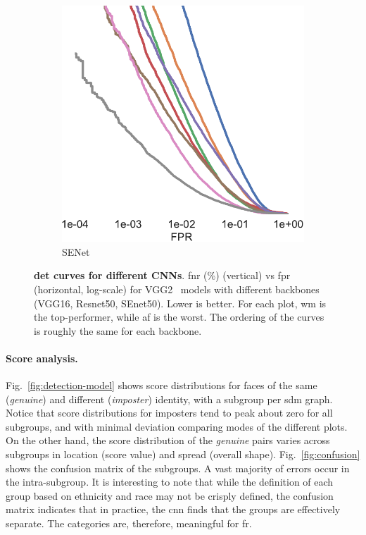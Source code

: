 \begin{figure}[h!]
\begin{subfigure}[t]{.27\linewidth}
    \includegraphics[width=.75\linewidth]{figures/curve_senet50_subgroups-crop.pdf}
    \caption{SENet~\cite{hu2018squeeze}}
    \end{subfigure}
    \caption{\small{\textbf{\gls{det} curves for different CNNs}. \gls{fnr} (\%) (vertical) vs \gls{fpr}  (horizontal, log-scale) for VGG2~\cite{Cao18} models with different backbones (VGG16, Resnet50, SEnet50). Lower is better. For each plot, \gls{wm} is the top-performer, while \gls{af} is the worst. The ordering of the curves is roughly the same for each backbone.}}\label{fig:sdm-appendix-a}
    \vspace{-5mm}
\end{figure}

\vspace{-5mm}
\noindent\paragraph{Score analysis.}
Fig.~\ref{fig:detection-model} shows score distributions for faces of the same (\ie \emph{genuine}) and different (\ie \emph{imposter}) identity, with a subgroup per \gls{sdm} graph. Notice that score distributions for imposters tend to peak about zero for all subgroups, and with minimal deviation comparing modes of the different plots. On the other hand, the score distribution of the \emph{genuine} pairs varies across subgroups in location (\ie score value) and spread (\ie overall shape).
Fig.~\ref{fig:confusion} shows the confusion matrix of the subgroups. A vast majority of errors occur in the intra-subgroup. It is interesting to note that while the definition of  each group  based on ethnicity and race may not be crisply defined, the confusion matrix indicates that in practice, the \gls{cnn} finds that the groups are effectively separate. The categories are, therefore, meaningful for \gls{fr}.








